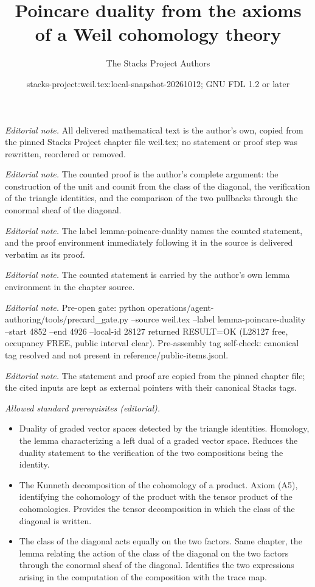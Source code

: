 \documentclass[10pt,a4paper]{amsart}
\title{Poincare duality from the axioms of a Weil cohomology theory}
\author{The Stacks Project Authors}
\date{stacks-project:weil.tex:local-snapshot-20261012; GNU FDL 1.2 or later}
\theoremstyle{plain}
\theoremstyle{definition}
\theoremstyle{remark}
\numberwithin{equation}{subsection}
\begin{document}
\maketitle
\noindent\textit{Editorial note.} All delivered mathematical text is the author's own, copied from the pinned Stacks Project chapter file weil.tex; no statement or proof step was rewritten, reordered or removed.\par\medskip
\noindent\textit{Editorial note.} The counted proof is the author's complete argument: the construction of the unit and counit from the class of the diagonal, the verification of the triangle identities, and the comparison of the two pullbacks through the conormal sheaf of the diagonal.\par\medskip
\noindent\textit{Editorial note.} The label lemma-poincare-duality names the counted statement, and the proof environment immediately following it in the source is delivered verbatim as its proof.\par\medskip
\noindent\textit{Editorial note.} The counted statement is carried by the author's own lemma environment in the chapter source.\par\medskip
\noindent\textit{Editorial note.} Pre-open gate: python operations/agent-authoring/tools/precard\_gate.py --source weil.tex --label lemma-poincare-duality --start 4852 --end 4926 --local-id 28127 returned RESULT=OK (L28127 free, occupancy FREE, public interval clear). Pre-assembly tag self-check: canonical tag resolved and not present in reference/public-items.jsonl.\par\medskip
\noindent\textit{Editorial note.} The statement and proof are copied from the pinned chapter file; the cited inputs are kept as external pointers with their canonical Stacks tags.\par\medskip
\noindent\textit{Allowed standard prerequisites (editorial).}\begin{itemize}
\item Duality of graded vector spaces detected by the triangle identities. Homology, the lemma characterizing a left dual of a graded vector space. Reduces the duality statement to the verification of the two compositions being the identity.
\item The Kunneth decomposition of the cohomology of a product. Axiom (A5), identifying the cohomology of the product with the tensor product of the cohomologies. Provides the tensor decomposition in which the class of the diagonal is written.
\item The class of the diagonal acts equally on the two factors. Same chapter, the lemma relating the action of the class of the diagonal on the two factors through the conormal sheaf of the diagonal. Identifies the two expressions arising in the computation of the composition with the trace map.
\end{itemize}\medskip
\end{document}
